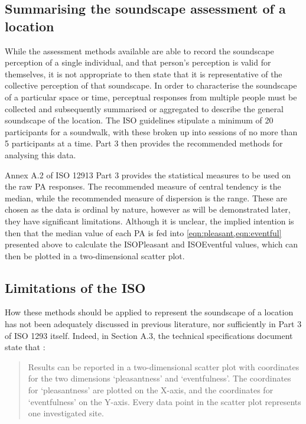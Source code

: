 \subsection{Summarising the soundscape assessment of a location}
While the assessment methods available are able to record the soundscape perception of a single individual, and that person's perception is valid for themselves, it is not appropriate to then state that it is representative of the collective perception of that soundscape. In order to characterise the soundscape of a particular space or time, perceptual responses from multiple people must be collected and subsequently summarised or aggregated to describe the general soundscape of the location. The ISO guidelines stipulate a minimum of 20 participants for a soundwalk, with these broken up into sessions of no more than 5 participants at a time. Part 3 then provides the recommended methods for analysing this data.

Annex A.2 of ISO 12913 Part 3 provides the statistical measures to be used on the raw PA responses. The recommended measure of central tendency is the median, while the recommended measure of dispersion is the range. These are chosen as the data is ordinal by nature, however as will be demonstrated later, they have significant limitations. Although it is unclear, the implied intention is then that the median value of each PA is fed into \cref{eqn:pleasant,eqn:eventful} presented above to calculate the ISOPleasant and ISOEventful values, which can then be plotted in a two-dimensional scatter plot.

\subsection{Limitations of the ISO}
How these methods should be applied to represent the soundscape of a location has not been adequately discussed in previous literature, nor sufficiently in Part 3 of ISO 1293 itself. Indeed, in Section A.3, the technical specifications document state that \citep[p. 5]{ISO12913Part3}:

\begin{quote}
  Results can be reported in a two-dimensional scatter plot with coordinates for the two dimensions ‘pleasantness’ and ‘eventfulness’. The coordinates for ‘pleasantness’ are plotted on the X-axis, and the coordinates for ‘eventfulness’ on the Y-axis. Every data point in the scatter plot represents one investigated site.
\end{quote}

